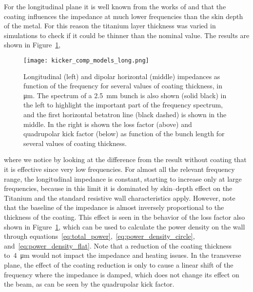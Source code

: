     For the longitudinal plane it is well known from the works of  and  that the coating influences the impedance at much lower frequencies than the skin depth of the metal. For this reason the titanium layer thickness was varied in simulations to check if it could be thinner than the nominal value. The results are shown in Figure~\ref{fig:kicker_comp_models_long},
    \begin{figure}
        \centering
        \texttt{[image: kicker\_comp\_models\_long.png]}
        \caption[Titanium coating thickness effect on impedance.]{Longitudinal (left) and dipolar horizontal (middle) impedances as function of the frequency for several values of coating thickness, in \si{\micro\meter}. The spectrum of a \SI{2.5}{\milli\meter} bunch is also shown (solid black) in the left to highlight the important part of the frequency spectrum, and the first horizontal betatron line (black dashed) is shown in the middle. In the right is shown the loss factor (above) and quadrupolar kick factor (below) as function of the bunch length for several values of coating thickness.}
        \label{fig:kicker_comp_models_long}
    \end{figure}
    where we notice by looking at the difference from the result without coating that it is effective since very low frequencies. For almost all the relevant frequency range, the longitudinal impedance is constant, starting to increase only at large frequencies, because in this limit it is dominated by skin--depth effect on the Titanium and the standard resistive wall characteristics apply. However, note that the baseline of the impedance is almost inversely proportional to the thickness of the coating. This effect is seen in the behavior of the loss factor also shown in Figure~\ref{fig:kicker_comp_models_long}, which can be used to calculate the power density on the wall through equations~\eqref{eq:total_power},~\eqref{eq:power_density_circle}, and~\eqref{eq:power_density_flat}. Note that a reduction of the coating thickness to~\SI{4}{\micro\meter} would not impact the impedance and heating issues. In the transverse plane, the effect of the coating reduction is only to cause a linear shift of the frequency where the impedance is damped, which does not change its effect on the beam, as can be seen by the quadrupolar kick factor.

